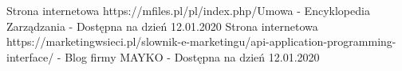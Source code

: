 \begin{thebibliography}{99}
     Strona internetowa https://mfiles.pl/pl/index.php/Umowa - Encyklopedia Zarządzania - Dostępna na dzień 12.01.2020 
     Strona internetowa https://marketingwsieci.pl/slownik-e-marketingu/api-application-programming-interface/ - Blog firmy MAYKO - Dostępna na dzień 12.01.2020 
\end{thebibliography}